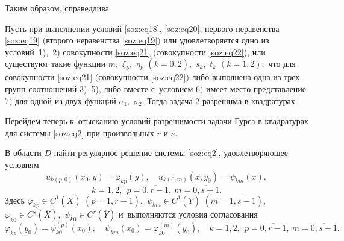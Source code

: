 \medskip

Таким образом, справедлива

\hypertarget{soz:th4}{}
\begin{theorem}[4]Пусть при выполнении условий {\rm \eqref{soz:eq18}, \eqref{soz:eq20},} 
первого неравенства  \eqref{soz:eq19} $($второго неравенства \eqref{soz:eq19}$)$ или удовлетворяется  одно из условий~\mbox{\rm 1), 2)} совокупности \eqref{soz:eq21}  $($совокупности \eqref{soz:eq22}{\rm),} или существуют такие функции $m,$ $\xi_{k},$ $\eta_{k}$ $(k=\overline{0, 2}),$ $s_{k},$ $t_{k}$ $(k=1, 2),$
что для совокупности \eqref{soz:eq21} $($совокупности \eqref{soz:eq22}$)$ либо выполнена одна из трех групп соотношений {\rm 3)--5),} либо вместе с~условием $6)$ имеет место представление $7)$
для одной из двух функций $\sigma_{1},$ $\sigma_{2}.$ 
Тогда задача  \hyperlink{soz:task2}{\rm 2} разрешима в квадратурах\rm.
\end{theorem}

\smallskip
\hypertarget{soz:p2}{}
Перейдем теперь к~отысканию условий разрешимости задачи Гурса в квадратурах  для системы \eqref{soz:eq2}  
при произвольных $r$ и $s$.

\smallskip

\hypertarget{soz:task3}{}

\begin{task}[3]В области $D$  найти регулярное решение системы {\rm \eqref{soz:eq2},}
удовлетворяющее условиям
$$
u_{k(p,0)}(x_{0},y)=\varphi_{kp}(y),\quad  
u_{k(0,m)}(x,y_{0})=\psi_{km}(x),$$
$$k=1, 2,\ \ p=\overline{0, r-1}, \ m=\overline{0, s-1}.
$$
Здесь 
$\varphi_{kp} \in C^{1}(\overline{X})$ $(p=\overline{1 , r-1}),$ 
$\psi_{km} \in C^{1}(\overline{Y})$ $(m=\overline{1, s-1}),$
$\varphi_{k0} \in C^{s}(\overline{X}),$ 
$\psi_{k0} \in C^{r}(\overline{Y})$ и~выполняются условия согласования
\begin{equation*}
\varphi_{kp}(y_{0})=\psi_{k0}^{(p)}(x_{0}),\quad 
\psi_{km}(x_{0})=\varphi_{k0}^{(m)}(y_{0}),\quad  k=1, 2,\ \ p=\overline{0, r-1},\ m=\overline{0, s-1}.
\end{equation*}
\end{task}

